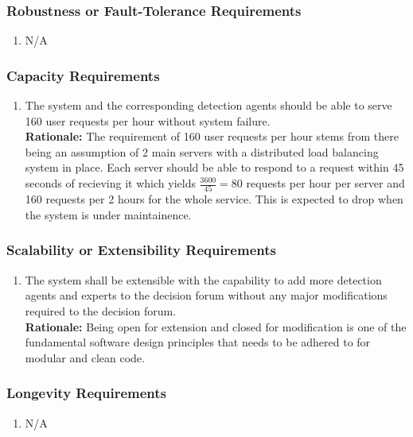\documentclass[]{article}
\begin{document}
\subsubsection{Robustness or Fault-Tolerance Requirements}
\label{ssub:robustness_or_fault_tolerance_requirements}
\begin{enumerate}[{PR-RFT}1. ]
	\item N/A
\end{enumerate}

\subsubsection{Capacity Requirements}
\label{ssub:capacity_requirements}
\begin{enumerate}[{PR-C}1. ]
	\item The system and the corresponding detection agents should be able to serve 160 user requests per hour without system failure.\\
	\textbf{Rationale:} The requirement of 160 user requests per hour stems from there being an assumption of 2 main servers with a distributed load balancing system in place. Each server should be able to respond
	to a request within 45 seconds of recieving it which yields $\frac{3600}{45} = 80$ requests per hour per server and 160 requests per 2 hours for the whole service. This is expected to drop when the system is under maintainence.
\end{enumerate}

\subsubsection{Scalability or Extensibility Requirements}
\label{ssub:scalability_or_extensibility_requirements}
\begin{enumerate}[{PR-SE}1. ]
	\item The system shall be extensible with the capability to add more detection agents and experts to the decision forum without any major modifications required to the decision forum.\\
	\textbf{Rationale:} Being open for extension and closed for modification is one of the fundamental software design principles that needs to be adhered to for modular and clean code. 
\end{enumerate}

\subsubsection{Longevity Requirements}
\label{ssub:longevity_requirements}
\begin{enumerate}[{PR-L}1. ]
	\item N/A
\end{enumerate}
\end{document}
